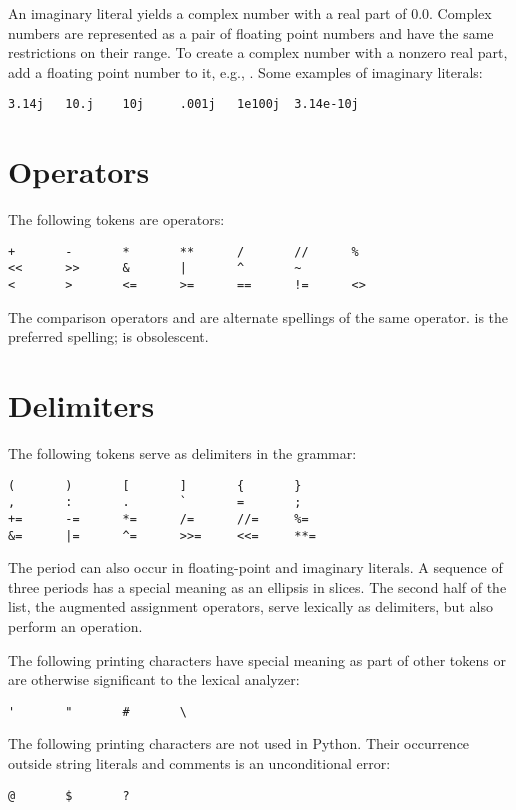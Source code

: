 \begin{productionlist}
\end{productionlist}

An imaginary literal yields a complex number with a real part of
0.0.  Complex numbers are represented as a pair of floating point
numbers and have the same restrictions on their range.  To create a
complex number with a nonzero real part, add a floating point number
to it, e.g., .  Some examples of imaginary literals:

\begin{verbatim}
3.14j   10.j    10j     .001j   1e100j  3.14e-10j 
\end{verbatim}


\section{Operators\label{operators}}

The following tokens are operators:

\begin{verbatim}
+       -       *       **      /       //      %
<<      >>      &       |       ^       ~
<       >       <=      >=      ==      !=      <>
\end{verbatim}

The comparison operators \code{<>} and \code{!=} are alternate
spellings of the same operator.  \code{!=} is the preferred spelling;
\code{<>} is obsolescent.


\section{Delimiters\label{delimiters}}

The following tokens serve as delimiters in the grammar:

\begin{verbatim}
(       )       [       ]       {       }
,       :       .       `       =       ;
+=      -=      *=      /=      //=     %=
&=      |=      ^=      >>=     <<=     **=
\end{verbatim}

The period can also occur in floating-point and imaginary literals.  A
sequence of three periods has a special meaning as an ellipsis in slices.
The second half of the list, the augmented assignment operators, serve
lexically as delimiters, but also perform an operation.

The following printing \ASCII{} characters have special meaning as part
of other tokens or are otherwise significant to the lexical analyzer:

\begin{verbatim}
'       "       #       \
\end{verbatim}

The following printing \ASCII{} characters are not used in Python.  Their
occurrence outside string literals and comments is an unconditional
error:

\begin{verbatim}
@       $       ?
\end{verbatim}
